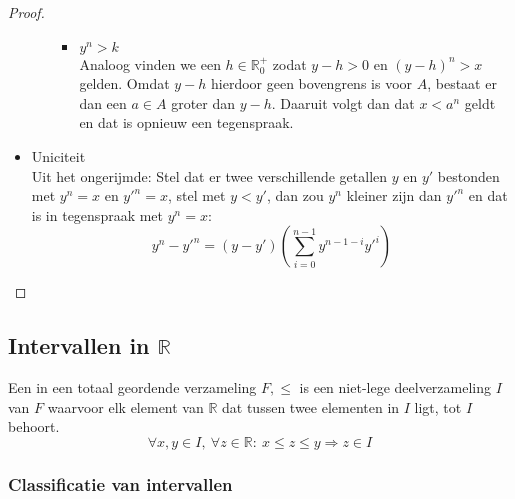 \documentclass[main.tex]{subfiles}
\begin{document}
\begin{st}
\begin{proof}
\begin{itemize}
\begin{itemize}
\begin{itemize}
        \item $y^{n}>k$\\
          Analoog vinden we een $h\in \mathbb{R}_{0}^{+}$ zodat $y-h>0$ en $(y-h)^{n}>x$ gelden.
          Omdat $y-h$ hierdoor geen bovengrens is voor $A$\waarom, bestaat er dan een $a\in A$ groter dan $y-h$.
          Daaruit volgt dan dat $x<a^{n}$ geldt en dat is opnieuw een tegenspraak.
        \end{itemize}
      \end{itemize}
    \item Uniciteit\\
      Uit het ongerijmde:
      Stel dat er twee verschillende getallen $y$ en $y'$ bestonden met $y^{n}=x$ en $y'^{n}=x$, stel met $y<y'$, dan zou $y^{n}$ kleiner zijn dan $y'^{n}$ en dat is in tegenspraak met $y^{n}=x$:\waarom
      \[ y^{n}-y'^{n} = (y-y')\left( \sum^{n-1}_{i=0}y^{n-1-i}y'^{i}\right) \]
    \end{itemize}
  \end{proof}
\end{st}

\subsection{Intervallen in $\mathbb{R}$}
\label{sec:intervallen-in-R}

\begin{de}
  Een  in een totaal geordende verzameling $F,\le$ is een niet-lege deelverzameling $I$ van $F$ waarvoor elk element van $\mathbb{R}$ dat tussen twee elementen in $I$ ligt, tot $I$ behoort.
  \[ \forall x,y \in I,\ \forall z\in \mathbb{R}:\ x \le z \le y \Rightarrow z\in I \]
\end{de}

\subsubsection{Classificatie van intervallen}
\label{sec:class-van-interv}
\end{document}
